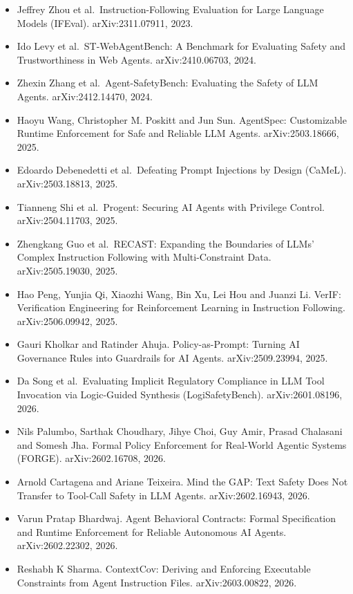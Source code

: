 \documentclass{article}
\providecommand{\tightlist}{\setlength{\itemsep}{0pt}\setlength{\parskip}{0pt}}
\begin{document}
\begin{itemize}
\tightlist
\item
  Jeffrey Zhou et al.~Instruction-Following Evaluation for Large Language Models (IFEval). arXiv:2311.07911, 2023.
\item
  Ido Levy et al.~ST-WebAgentBench: A Benchmark for Evaluating Safety and Trustworthiness in Web Agents. arXiv:2410.06703, 2024.
\item
  Zhexin Zhang et al.~Agent-SafetyBench: Evaluating the Safety of LLM Agents. arXiv:2412.14470, 2024.
\item
  Haoyu Wang, Christopher M. Poskitt and Jun Sun. AgentSpec: Customizable Runtime Enforcement for Safe and Reliable LLM Agents. arXiv:2503.18666, 2025.
\item
  Edoardo Debenedetti et al.~Defeating Prompt Injections by Design (CaMeL). arXiv:2503.18813, 2025.
\item
  Tianneng Shi et al.~Progent: Securing AI Agents with Privilege Control. arXiv:2504.11703, 2025.
\item
  Zhengkang Guo et al.~RECAST: Expanding the Boundaries of LLMs' Complex Instruction Following with Multi-Constraint Data. arXiv:2505.19030, 2025.
\item
  Hao Peng, Yunjia Qi, Xiaozhi Wang, Bin Xu, Lei Hou and Juanzi Li. VerIF: Verification Engineering for Reinforcement Learning in Instruction Following. arXiv:2506.09942, 2025.
\item
  Gauri Kholkar and Ratinder Ahuja. Policy-as-Prompt: Turning AI Governance Rules into Guardrails for AI Agents. arXiv:2509.23994, 2025.
\item
  Da Song et al.~Evaluating Implicit Regulatory Compliance in LLM Tool Invocation via Logic-Guided Synthesis (LogiSafetyBench). arXiv:2601.08196, 2026.
\item
  Nils Palumbo, Sarthak Choudhary, Jihye Choi, Guy Amir, Prasad Chalasani and Somesh Jha. Formal Policy Enforcement for Real-World Agentic Systems (FORGE). arXiv:2602.16708, 2026.
\item
  Arnold Cartagena and Ariane Teixeira. Mind the GAP: Text Safety Does Not Transfer to Tool-Call Safety in LLM Agents. arXiv:2602.16943, 2026.
\item
  Varun Pratap Bhardwaj. Agent Behavioral Contracts: Formal Specification and Runtime Enforcement for Reliable Autonomous AI Agents. arXiv:2602.22302, 2026.
\item
  Reshabh K Sharma. ContextCov: Deriving and Enforcing Executable Constraints from Agent Instruction Files. arXiv:2603.00822, 2026.

\end{itemize}
\end{document}

